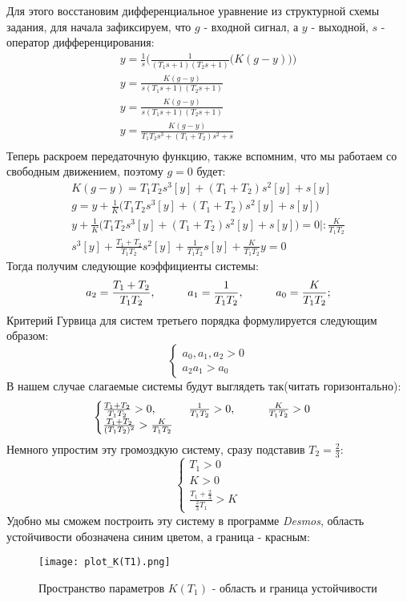 Для этого восстановим дифференциальное уравнение из структурной схемы задания, для начала зафиксируем, что $g$ - входной сигнал, а $y$ - выходной, $s$ - оператор дифференцирования:
$$
\begin{aligned}
  y = \frac{1}{s}\bigg(  \frac{1}{(T_1s+1)(T_2s+1)}\bigg( K(g-y) \bigg) \bigg) \\
  y = \frac{K(g-y)}{s(T_1s+1)(T_2s+1)} \\
  y = \frac{K(g-y)}{s(T_1s+1)(T_2s+1)} \\
  y = \frac{K(g-y)}{T_1T_2s^3+(T_1+T_2)s^2 + s} \\
\end{aligned}
$$
Теперь раскроем передаточную функцию, также вспомним, что мы работаем со свободным движением, поэтому $g=0$ будет:
$$
\begin{aligned}
  K(g-y) = T_1T_2s^3[y]+(T_1+T_2)s^2[y] + s[y] \\
  g = y + \frac{1}{K}\bigg(  T_1T_2s^3[y]+(T_1+T_2)s^2[y] + s[y] \bigg) \\
  y + \frac{1}{K}\bigg(  T_1T_2s^3[y]+(T_1+T_2)s^2[y] + s[y] \bigg) = 0 \bigg|:\frac{K}{T_1T_2} \\
  s^3[y]+ \frac{T_1+T_2}{T_1T_2}s^2[y] + \frac{1}{T_1T_2}s[y] + \frac{K}{T_1T_2}y = 0
\end{aligned}
$$
Тогда получим следующие коэффициенты системы:
$$
a_2 = \frac{T_1+T_2}{T_1T_2}, \hspace*{1cm} a_1 =\frac{1}{T_1T_2}, \hspace*{1cm} a_0= \frac{K}{T_1T_2};
$$
Критерий Гурвица для систем третьего порядка формулируется следующим образом:
$$
\begin{cases}
  a_0,a_1,a_2 > 0 \\
  a_2a_1>a_0
\end{cases}
$$
В нашем случае слагаемые системы будут выглядеть так(читать горизонтально):
$$
\begin{cases}
  \frac{T_1+T_2}{T_1T_2}>0, \hspace*{1cm} \frac{1}{T_1T_2}>0, \hspace*{1cm} \frac{K}{T_1T_2}>0 \\
  \frac{T_1+T_2}{(T_1T_2)^2}>\frac{K}{T_1T_2}
\end{cases}
$$ 
Немного упростим эту громоздкую систему, сразу подставив $T_2 = \frac{2}{3}$:
$$
\begin{cases}
  T_1 > 0\\
  K > 0\\
  \frac{T_1+\frac{2}{3}}{\frac{2}{3}T_1}>K
\end{cases}
$$ 
Удобно мы сможем построить эту систему в программе \textit{Desmos}, область устойчивости обозначена синим цветом, а граница - красным:
\begin{figure}[ht]
  \centering
  \texttt{[image: plot\_K(T1).png]}
\caption{Пространство параметров $K(T_1)$ - область и граница устойчивости}
\end{figure}

